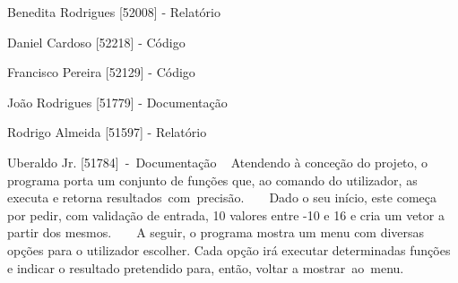 
\begin{DoxyItemize}
\item Benedita Rodrigues \mbox{[}52008\mbox{]} -\/ Relatório ~\newline

\item Daniel Cardoso \mbox{[}52218\mbox{]} -\/ Código ~\newline

\item Francisco Pereira \mbox{[}52129\mbox{]} -\/ Código ~\newline

\item João Rodrigues \mbox{[}51779\mbox{]} -\/ Documentação ~\newline

\item Rodrigo Almeida \mbox{[}51597\mbox{]} -\/ Relatório ~\newline

\item Uberaldo Jr. \mbox{[}51784\mbox{]}~-\/~Documentação ~\newline
 Atendendo à conceção do projeto, o programa porta um conjunto de funções que, ao comando do utilizador, as executa e retorna resultados~com~precisão. ~\newline
 ~\newline
Dado o seu início, este começa por pedir, com validação de entrada, 10 valores entre -\/10 e 16 e cria um vetor a partir dos mesmos. ~\newline
 ~\newline
A seguir, o programa mostra um menu com diversas opções para o utilizador escolher. Cada opção irá executar determinadas funções e indicar o resultado pretendido para, então, voltar a mostrar~ao~menu. 
\end{DoxyItemize}
